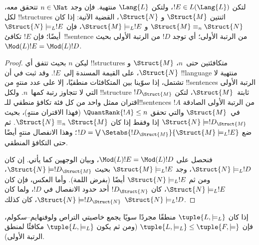 \documentclass[../../../include/open-logic-section]{subfiles}
\begin{document}


\begin{lem}
لتكن $!E \in L(\Lang{L})$، ولتكن $\Lang{L}$ منتهية. فإن
وجد $n \in \Nat$ تتحقق معه، لكل !!{structure}s اثنتين $\Struct{M}$ و
$\Struct{N}$، القضية الآتية: إذا كان $\Struct{M} \equiv_n \Struct{N}$ و
$\Struct{M} \models_L !E$، فإن $\Struct{N} \models_L !E$ أيضًا؛
فإن $!E$ تكافئ~!!{sentence} من الرتبة الأولى؛ أي توجد $!D$ من الرتبة
الأولى بحيث $\Mod(L){!E}=\Mod(L){!D}$.
\end{lem}

\begin{proof}
ليكن $n$ بحيث تتفق أي !!{structure}s متكافئتين حتى~$n$، $\Struct{M}$
و$\Struct{N}$، على القيمة المسندة إلى~$!E$. وقد ثبت في
 أن !!{language} منتهية لا تشتمل، إذا سوّينا بين المتكافئات
منطقيًا، إلا على عدد منتهٍ من !!{sentence}s الرتبة الأولى التي لا
تتجاوز رتبة كمها~$n$. ولكل !!{structure} ثابتة~$\Struct{M}$، لتكن
$!D_{\Struct{M}}$ اقتران ممثل واحد من كل فئة تكافؤ منطقي للـ!!{sentence}s
$!A$ من الرتبة الأولى الصادقة في~$\Struct{M}$ والتي تحقق
$\QuantRank{!A} \le n$ (فهذا الاقتران منتهٍ)، بحيث
$\Struct{N} \models !D_{\Struct{M}}$ إذا وفقط إذا كان
$\Struct{N} \equiv_n \Struct{M}$. ثم ضع
$!D = \textstyle\bigvee
\Setabs{!D_{\Struct{M}}}{\Struct{M} \models_L !E}$؛ وهذا الانفصال منتهٍ
أيضًا حتى التكافؤ المنطقي.

فنحصل على $\Mod(L){!E}=\Mod(L){!D}$، وبيان الوجهين كما يأتي. إن كان
$\Struct{N} \models_L !D$، وجد $\Struct{M} \models_L !E$ بحيث
$\Struct{N} \models !D_{\Struct{M}}$، ومن ثم
$\Struct{N} \models_L !E$ أيضًا (بفرض اللمة). وأما العكس، فإن كان
$\Struct{N} \models_L !E$، كان $!D_\Struct{N}$ أحد حدود الانفصال في
$!D$، ولما كان $\Struct{N} \models !D_\Struct{N}$، كان كذلك
$\Struct{N} \models_L !D$.
\end{proof}

\begin{thm}
   إذا كان $\tuple{L,\models_L}$ منطقًا مجردًا سويًا
  يجمع خاصيتي التراص ولوفنهايم--سكولم، فإن
  $\tuple{L,\models_L} \le \tuple{F,\models}$ (ومن ثم يكون
  $\tuple{L,\models_L}$ مكافئًا لمنطق الرتبة الأولى).
\end{thm}
\end{document}
